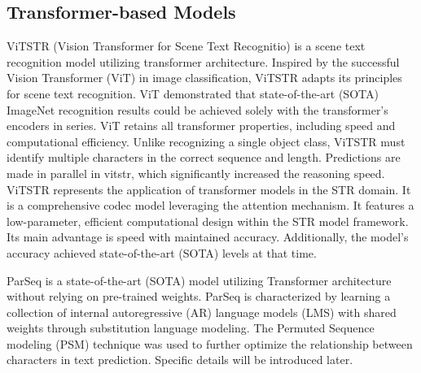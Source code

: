 \documentclass[runningheads]{llncs}
\begin{document}
\subsection{Transformer-based Models} \label{subsec:transformer}
ViTSTR\cite{atienza2021vision_VITSTR} (Vision Transformer for Scene Text Recognitio) is a scene text recognition model utilizing transformer architecture.	Inspired by the successful Vision Transformer (ViT) in image classification, ViTSTR adapts its principles for scene text recognition.	ViT demonstrated that state-of-the-art (SOTA) ImageNet recognition results could be achieved solely with the transformer's encoders in series.	ViT retains all transformer properties, including speed and computational efficiency.	Unlike recognizing a single object class, ViTSTR must identify multiple characters in the correct sequence and length.	Predictions are made in parallel in vitstr, which significantly increased the reasoning speed.	
ViTSTR represents the application of transformer models in the STR domain.	It is a comprehensive codec model leveraging the attention mechanism.	It features a low-parameter, efficient computational design within the STR model framework.	Its main advantage is speed with maintained accuracy.	Additionally, the model's accuracy achieved state-of-the-art (SOTA) levels at that time.	


ParSeq\cite{bautista2022parseq} is a state-of-the-art (SOTA) model utilizing Transformer architecture without relying on pre-trained weights.	ParSeq is characterized by learning a collection of internal autoregressive (AR) language models (LMS) with shared weights through substitution language modeling. The Permuted Sequence modeling (PSM) technique was used to further optimize the relationship between characters in text prediction. Specific details will be introduced later.
\end{document}
